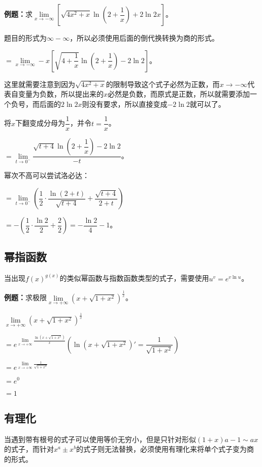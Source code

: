 \documentclass[UTF8, 12pt]{ctexart}
\begin{document}
\textbf{例题：}求$\lim\limits_{x\to-\infty}\left[\sqrt{4x^2+x}\ln\left(2+\dfrac{1}{x}\right)+2\ln 2x\right]$。\medskip

题目的形式为$\infty-\infty$，所以必须使用后面的倒代换转换为商的形式。\medskip

$=\lim\limits_{x\to-\infty}-x\left[\sqrt{4+\dfrac{1}{x}}\ln\left(2+\dfrac{1}{x}\right)-2\ln 2\right]$。 \medskip

这里就需要注意到因为$\sqrt{4x^2+x}$的限制导致这个式子必然为正数，而$x\to-\infty$代表自变量为负数，所以提出来的$x$必然是负数，而原式是正数，所以就需要添加一个负号，而后面的$2\ln 2x$则没有要求，所以直接变成$-2\ln 2$就可以了。

将$x$下翻变成分母为$\dfrac{1}{x}$，并令$t=\dfrac{1}{x}$。\medskip

$=\lim\limits_{t\to 0^-}\dfrac{\sqrt{t+4}\ln\left(2+\dfrac{1}{x}\right)-2\ln 2}{-t}$。\medskip

幂次不高可以尝试洛必达：\medskip

$=\lim\limits_{t\to 0^-}\left(\dfrac{1}{2}\cdot\dfrac{\ln(2+t)}{\sqrt{t+4}}+\dfrac{\sqrt{t+4}}{2+t}\right)$\medskip

$=-\left(\dfrac{1}{2}\cdot\dfrac{\ln 2}{2}+\dfrac{2}{2}\right)=-\dfrac{\ln 2}{4}-1$。

\subsection{幂指函数}

当出现$f(x)^{g(x)}$的类似幂函数与指数函数类型的式子，需要使用$u^v=e^{v\ln u}$。

\textbf{例题：}求极限$\lim\limits_{x\to+\infty}(x+\sqrt{1+x^2})^{\frac{1}{x}}$。\medskip

$\lim\limits_{x\to+\infty}(x+\sqrt{1+x^2})^{\frac{1}{x}}$ \medskip

$=e^{\lim\limits_{x\to+\infty}\frac{\ln(x+\sqrt{1+x^2})}{x}} \left(\ln(x+\sqrt{1+x^2})'=\dfrac{1}{\sqrt{1+x^2}}\right)$\medskip

$=e^{\lim\limits_{x\to+\infty}\frac{1}{\sqrt{1+x^2}}}$

$=e^0$

$=1$

\subsection{有理化}

当遇到带有根号的式子可以使用等价无穷小，但是只针对形似$(1+x)a-1\sim ax$的式子，而针对$x^a\pm x^b$的式子则无法替换，必须使用有理化来将单个式子变为商的形式。
\end{document}
